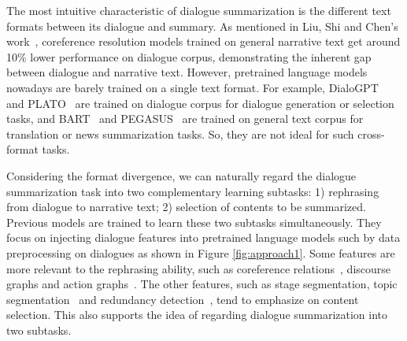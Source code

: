 





The most intuitive characteristic of dialogue summarization is the different 
text formats between its dialogue and summary. As mentioned in Liu, Shi and Chen's work~, coreference resolution models trained on general narrative text get around 10\% lower performance on dialogue corpus, demonstrating the inherent gap between dialogue and narrative text.
However, pretrained language models nowadays are barely trained on a single text format. For example, DialoGPT~\cite{zhang2020dialogpt} and PLATO~\cite{bao2020plato} are trained on dialogue corpus for dialogue generation or selection tasks, and BART~\cite{lewis2020bart} and PEGASUS~\cite{zhang2020pegasus} are trained on general text corpus for translation or news summarization tasks. So, they are not ideal for such cross-format tasks.



Considering the format divergence, we can naturally regard the dialogue summarization task into two complementary learning subtasks:
1) rephrasing from dialogue to narrative text; 2) selection of contents to be summarized. 
Previous models are trained to learn these two subtasks simultaneously.
They focus on injecting dialogue features into pretrained language models such by data preprocessing on dialogues %
as shown in Figure \ref{fig:approach1}. 
Some features are more relevant to the rephrasing ability, such as coreference relations~\cite{liu2021coreference}, discourse graphs and action graphs~\cite{chen2021structure}. The other features, such as stage segmentation, topic segmentation~\cite{chen2020multi} and redundancy detection~\cite{feng2021language}, tend to emphasize on content selection. This also supports the idea of regarding dialogue summarization into two subtasks.


